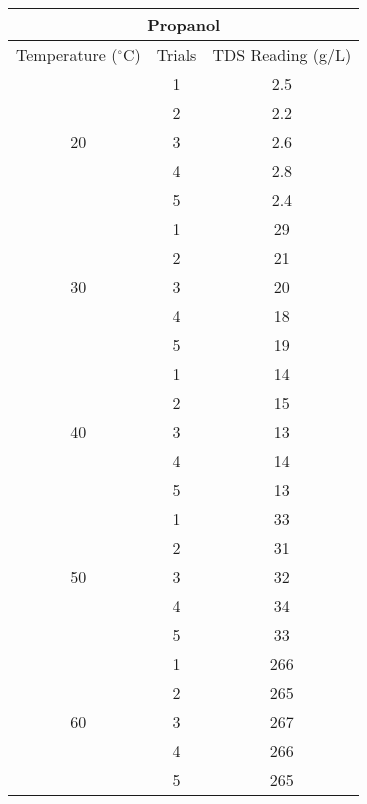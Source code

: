 

\begin{table}[H]
  \centering
    \begin{tabular}{ccc}
    \toprule
    \multicolumn{3}{c}{Propanol} \\
    \midrule
    Temperature ($^\circ$C) & Trials & TDS Reading (g/L)  \\
    \midrule
    \multirow{5}[10]{*}{20} & 1     & 2.5 \\
\cmidrule{2-3}          & 2     & 2.2 \\
\cmidrule{2-3}          & 3     & 2.6 \\
\cmidrule{2-3}          & 4     & 2.8 \\
\cmidrule{2-3}          & 5     & 2.4 \\
    \midrule
    \multirow{5}[10]{*}{30} & 1     & 29 \\
\cmidrule{2-3}          & 2     & 21 \\
\cmidrule{2-3}          & 3     & 20 \\
\cmidrule{2-3}          & 4     & 18 \\
\cmidrule{2-3}          & 5     & 19 \\
    \midrule
    \multirow{5}[10]{*}{40} & 1     & 14 \\
\cmidrule{2-3}          & 2     & 15 \\
\cmidrule{2-3}          & 3     & 13 \\
\cmidrule{2-3}          & 4     & 14 \\
\cmidrule{2-3}          & 5     & 13 \\
    \midrule
    \multirow{5}[10]{*}{50} & 1     & 33 \\
\cmidrule{2-3}          & 2     & 31 \\
\cmidrule{2-3}          & 3     & 32 \\
\cmidrule{2-3}          & 4     & 34 \\
\cmidrule{2-3}          & 5     & 33 \\
    \midrule
    \multirow{5}[10]{*}{60} & 1     & 266 \\
\cmidrule{2-3}          & 2     & 265 \\
\cmidrule{2-3}          & 3     & 267 \\
\cmidrule{2-3}          & 4     & 266 \\
\cmidrule{2-3}          & 5     & 265 \\
    \bottomrule
    \end{tabular}%
  \label{tab:addlabel}%
\end{table}%


